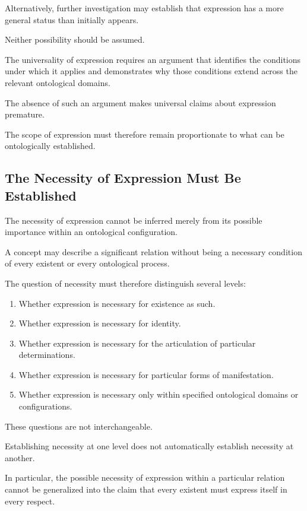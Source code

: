 Alternatively, further investigation may establish
that expression has a more general status than
initially appears.

Neither possibility should be assumed.

The universality of expression requires an argument
that identifies the conditions under which it
applies and demonstrates why those conditions
extend across the relevant ontological domains.

The absence of such an argument makes universal
claims about expression premature.

The scope of expression must therefore remain
proportionate to what can be ontologically established.

\subsection{The Necessity of Expression Must Be Established}

The necessity of expression cannot be inferred
merely from its possible importance within an
ontological configuration.

A concept may describe a significant relation
without being a necessary condition of every
existent or every ontological process.

The question of necessity must therefore distinguish
several levels:

\begin{enumerate}
    \item Whether expression is necessary for existence
    as such.

    \item Whether expression is necessary for identity.

    \item Whether expression is necessary for the
    articulation of particular determinations.

    \item Whether expression is necessary for particular
    forms of manifestation.

    \item Whether expression is necessary only within
    specified ontological domains or configurations.
\end{enumerate}

These questions are not interchangeable.

Establishing necessity at one level does not
automatically establish necessity at another.

In particular, the possible necessity of expression
within a particular relation cannot be generalized
into the claim that every existent must express
itself in every respect.

